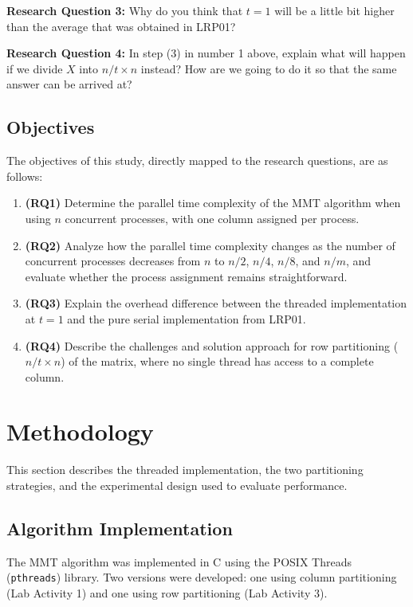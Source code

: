 \documentclass[journal]{IEEEtran}
\begin{document}
\noindent\textbf{Research Question 3:} Why do you think that $t = 1$ will be a little bit higher than the average that was obtained in LRP01?

\noindent\textbf{Research Question 4:} In step (3) in number 1 above, explain what will happen if we divide $X$ into $n/t \times n$ instead? How are we going to do it so that the same answer can be arrived at?

\subsection{Objectives}

The objectives of this study, directly mapped to the research questions, are as follows:

\begin{enumerate}
    \item \textbf{(RQ1)} Determine the parallel time complexity of the MMT algorithm when using $n$ concurrent processes, with one column assigned per process.
    \item \textbf{(RQ2)} Analyze how the parallel time complexity changes as the number of concurrent processes decreases from $n$ to $n/2$, $n/4$, $n/8$, and $n/m$, and evaluate whether the process assignment remains straightforward.
    \item \textbf{(RQ3)} Explain the overhead difference between the threaded implementation at $t = 1$ and the pure serial implementation from LRP01.
    \item \textbf{(RQ4)} Describe the challenges and solution approach for row partitioning ($n/t \times n$) of the matrix, where no single thread has access to a complete column.
\end{enumerate}

\section{Methodology}

This section describes the threaded implementation, the two partitioning strategies, and the experimental design used to evaluate performance.

\subsection{Algorithm Implementation}

The MMT algorithm was implemented in C using the POSIX Threads (\texttt{pthreads}) library. Two versions were developed: one using column partitioning (Lab Activity 1) and one using row partitioning (Lab Activity 3).
\end{document}
